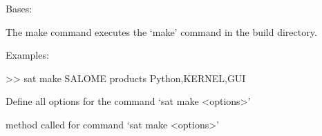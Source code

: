 \documentclass[a4paper,10pt,english]{sphinxmanual}
\begin{document}
\begin{fulllineitems}
\label{\detokenize{apidoc_commands/commands:commands.make.Command}}
Bases: 

The make command executes the ‘make’ command in the build directory.

\begin{DUlineblock}{0em}
\item[] Examples:
\item[] \textgreater{}\textgreater{} sat make SALOME \textendash{}products Python,KERNEL,GUI
\end{DUlineblock}

\begin{fulllineitems}
\label{\detokenize{apidoc_commands/commands:commands.make.Command.getParser}}
Define all options for the command ‘sat make \textless{}options\textgreater{}’

\end{fulllineitems}


\begin{fulllineitems}
\label{\detokenize{apidoc_commands/commands:commands.make.Command.name}}
\end{fulllineitems}


\begin{fulllineitems}
\label{\detokenize{apidoc_commands/commands:commands.make.Command.run}}
method called for command ‘sat make \textless{}options\textgreater{}’

\end{fulllineitems}


\end{fulllineitems}


\begin{fulllineitems}
\label{\detokenize{apidoc_commands/commands:commands.make.get_nb_proc}}
\end{fulllineitems}
\end{document}
